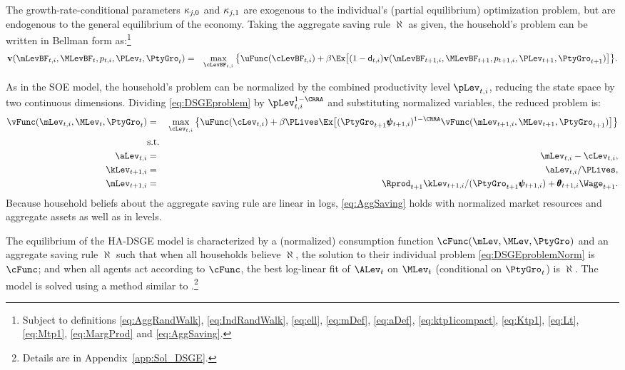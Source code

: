 \documentclass[titlepage]{\econtex}\newcommand{\texname}{cAndCwithStickyE}
\begin{document}
The growth-rate-conditional parameters $\kappa_{j,0}$ and $\kappa_{j,1}$ are exogenous to
the individual's (partial equilibrium) optimization problem, but are endogenous to the general
equilibrium of the economy.  Taking the aggregate saving rule $\aleph$ as given, the household's
problem can be written in Bellman form as:\footnote{Subject to definitions \eqref{eq:AggRandWalk},
\eqref{eq:IndRandWalk}, \eqref{eq:ell}, \eqref{eq:mDef}, \eqref{eq:aDef}, \eqref{eq:ktp1icompact},
\eqref{eq:Ktp1}, \eqref{eq:Lt}, \eqref{eq:Mtp1}, \eqref{eq:MargProd} and \eqref{eq:AggSaving}.}
\begin{eqnarray}
\textbf{v}(\mLevBF_{t,i},\MLevBF_t,p_{t,i},\PLev_t,\PtyGro_t) &=& \max_{\cLevBF_{t,i}} \big\{ \uFunc(\cLevBF_{t,i}) + \beta \Ex\big[(1-\pDies_{t,i})\textbf{v}(\mLevBF_{t+1,i},\MLevBF_{t+1},p_{t+1,i},\PLev_{t+1},\PtyGro_{t+1})\big] \big\}. \nonumber \\ \label{eq:DSGEproblem}
\end{eqnarray}

As in the SOE model, the household's problem can be normalized by the combined productivity level $\pLev_{t,i}$, reducing the state space by two continuous dimensions.  Dividing \eqref{eq:DSGEproblem} by $\pLev_{t,i}^{1-\CRRA}$ and substituting normalized variables, the reduced problem is:
\begin{eqnarray}
\vFunc(\mLev_{t,i},\MLev_t,\PtyGro_t) &=& \max_{\cLev_{t,i}} \big\{ \uFunc(\cLev_{t,i}) + \beta \PLives \Ex\big[(\PtyGro_{t+1} \pmb{\psi}_{t+1,i})^{1-\CRRA}\vFunc(\mLev_{t+1,i},\MLev_{t+1},\PtyGro_{t+1})\big] \big\} \nonumber \\
& \text{s.t.} & \label{eq:DSGEproblemNorm}\\
\aLev_{t,i} & = & \mLev_{t,i} - \cLev_{t,i}, \nonumber \\
\kLev_{t+1,i} & = & \aLev_{t,i}/\PLives, \nonumber \\
\mLev_{t+1,i} & = & \Rprod_{t+1} \kLev_{t+1,i}/(\PtyGro_{t+1}\pmb{\psi}_{t+1,i}) + \pmb{\theta}_{t+1,i} \Wage_{t+1}. \nonumber
\end{eqnarray}
Because household beliefs about the aggregate saving rule are linear in logs, \eqref{eq:AggSaving} holds with normalized market resources and aggregate assets as well as in levels.

The equilibrium of the HA-DSGE model is characterized by a (normalized) consumption function $\cFunc(\mLev,\MLev,\PtyGro)$ and an aggregate saving rule $\aleph$ such that when all households believe $\aleph$, the solution to their individual problem \eqref{eq:DSGEproblemNorm} is $\cFunc$; and when all agents act according to $\cFunc$, the best log-linear fit of $\ALev_t$ on $\MLev_t$ (conditional on $\PtyGro_t$) is $\aleph$.  The model is solved using a method similar to \cite{ksHetero}.\footnote{Details are in Appendix~\ref{app:Sol_DSGE}.}
\end{document}
